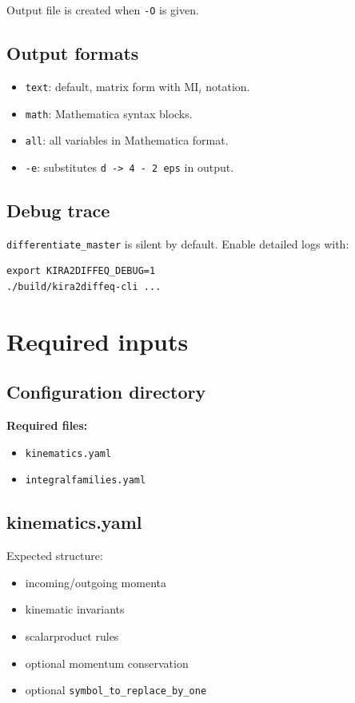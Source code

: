 \documentclass[11pt,openany]{report}
\newcommand{\code}[1]{\texttt{#1}}
\begin{document}
Output file is created when \code{-O} is given.

\section{Output formats}
\begin{itemize}
  \item \code{text}: default, matrix form with $\mathrm{MI}_i$ notation.
  \item \code{math}: Mathematica syntax blocks.
  \item \code{all}: all variables in Mathematica format.
  \item \code{-e}: substitutes \code{d -> 4 - 2 eps} in output.
\end{itemize}

\section{Debug trace}
\code{differentiate\_master} is silent by default.
Enable detailed logs with:
\begin{verbatim}
export KIRA2DIFFEQ_DEBUG=1
./build/kira2diffeq-cli ...
\end{verbatim}

\chapter{Required inputs}

\section{Configuration directory}
\textbf{Required files:}
\begin{itemize}
  \item \code{kinematics.yaml}
  \item \code{integralfamilies.yaml}
\end{itemize}

\section{kinematics.yaml}
Expected structure:
\begin{itemize}
  \item incoming/outgoing momenta
  \item kinematic invariants
  \item scalarproduct rules
  \item optional momentum conservation
  \item optional \code{symbol\_to\_replace\_by\_one}
\end{itemize}
\end{document}
